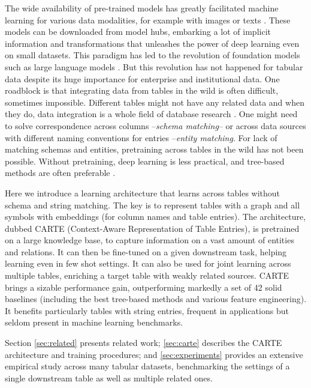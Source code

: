 \documentclass{article}
\theoremstyle{plain}
\theoremstyle{definition}
\theoremstyle{remark}
\begin{document}
The wide availability of pre-trained models has greatly facilitated machine learning for various data modalities, for example with images \citep{simonyan2015very} or texts \citep{devlinBERTPretrainingDeep2019}. These models can be downloaded from model hubs, embarking a lot of implicit information and transformations that unleashes the power of deep learning even on small datasets. This paradigm has led to the revolution of foundation models \citep{bommasani2021opportunities} such as large language models \citep{touvron2023llama}. But this revolution has not happened for tabular data despite its huge importance for enterprise and institutional data. One roadblock is that integrating data from tables in the wild is often difficult, sometimes impossible. Different tables might not have any related data and when they do, data integration is a whole field of database research \citep{doan2012principles}. One might need to solve correspondence across columns --\emph{schema matching}-- or across data sources with different naming conventions for entries --\emph{entity matching}.
For lack of matching schemas and entities, pretraining across tables in the wild has not been possible. Without pretraining, deep learning is less practical, and tree-based methods are often preferable \citep{grinsztajnWhyTreebasedModels2022}.

Here we introduce a learning architecture that learns across tables without schema and string matching. The key is to represent tables with a graph and all symbols with embeddings (for column names and table entries). The architecture, dubbed CARTE (Context-Aware Representation of Table Entries), is pretrained on a large knowledge base, to capture information on a vast amount of entities and relations. It can then be fine-tuned on a given downstream task, helping learning even in few shot settings. It can also be used for joint learning across multiple tables, enriching a target table with weakly related sources. 
CARTE brings a sizable performance gain, outperforming markedly a set of 42 solid baselines (including the best tree-based methods and various feature engineering).
It benefits particularly tables with string entries, frequent in applications but seldom present in machine learning benchmarks.


Section \ref{sec:related} presents related work; \autoref{sec:carte} describes the CARTE architecture and training procedures; and \autoref{sec:experiments} provides an extensive empirical study across many tabular datasets, benchmarking the settings of a single downstream table as well as multiple related ones.
\end{document}
